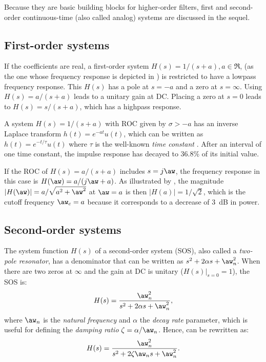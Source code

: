 Because they are basic building blocks for higher-order filters, first and second-order continuous-time (also called analog) systems are discussed in the sequel.

\subsection{First-order systems}
If the coefficients are real, a first-order system $H(s)=1/(s+a), a \in \Re$, (as the one whose frequency response is depicted in ) is restricted to have a lowpass frequency response. This $H(s)$ has a pole at $s=-a$ and a zero at $s=\infty$. Using $H(s)=a/(s+a)$ leads to a unitary gain at DC.
Placing a zero at $s=0$ leads to $H(s)=s/(s+a)$, which has a highpass response. 

A system $H(s)=1/(s+a)$ with ROC given by $\sigma > -a$ has an inverse Laplace transform $h(t) = e^{-a t} u(t)$, which can be written as $h(t) = e^{-t/\tau} u(t)$ where $\tau$ is the well-known \emph{time constant} .
After an interval of one time constant, the impulse response has decayed to 36.8\% of its initial value.

If the ROC of $H(s)=a/(s+a)$ includes $s=j \aw$, the frequency response in this case is $H(\aw)=a/(j\aw+a)$.
As illustrated by , the magnitude $|H(\aw)|=a/\sqrt{a^2+\aw^2}$ at $\aw=a$ is then $|H(a)|=1/\sqrt{2}$, which is the cutoff frequency $\aw_c=a$ because it corresponds to a decrease of 3~dB in power.

\subsection{Second-order systems}
\label{sec:secondOrderSystems}
The system function $H(s)$ of a second-order system (SOS), also called a \emph{two-pole resonator}, has a denominator that can be written as $s^2 + 2 \alpha s + \aw_n^2$. When there are two zeros at $\infty$
and the gain at DC is unitary ($H(s)|_{s=0}=1$), the SOS is:
\begin{equation}
H(s) = \frac{\aw_n^2}{s^2 + 2 \alpha s + \aw_n^2},
\label{eq:resonator}
\end{equation}
where $\aw_n$ is the \emph{natural frequency} and $\alpha$ the \emph{decay rate} parameter, which is useful for defining the \emph{damping ratio} $\zeta = \alpha / \aw_n$. Hence,  can be rewritten as:
\begin{equation}
H(s) = \frac{\aw_n^2}{s^2 + 2 \zeta \aw_n s + \aw_n^2}.
\label{eq:secondOrder1}
\end{equation}

